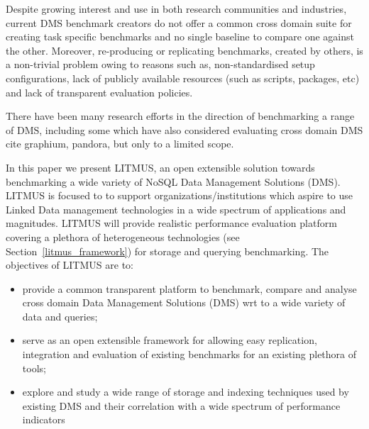 \documentclass{llncs}
\begin{document}
    Despite growing interest and use in both research communities and industries, current DMS benchmark creators do not offer a common cross domain suite for creating task specific benchmarks and no single baseline to compare one against the other. Moreover, re-producing or replicating benchmarks, created by others, is a non-trivial problem owing to reasons such as, non-standardised setup configurations, lack of publicly available resources (such as scripts, packages, etc) and lack of transparent evaluation policies. 
    
    There have been many research efforts in the direction of benchmarking a range of DMS, including some which have also considered evaluating cross domain DMS {cite graphium, pandora}, but only to a limited scope. 
    
    
    In this paper we present LITMUS, an open extensible solution towards benchmarking a wide variety of NoSQL Data Management Solutions (DMS). LITMUS is focused to to support organizations/institutions which aspire to use Linked Data management technologies in a wide spectrum of applications and magnitudes. 
    LITMUS will provide realistic performance evaluation platform covering a plethora of heterogeneous technologies (see Section~\ref{litmus_framework}) for storage and querying benchmarking. The objectives of LITMUS are to:
     \begin{itemize}[nosep]
        \item provide a common transparent platform to benchmark, compare and analyse cross domain Data Management Solutions (DMS) wrt to a wide variety of data and queries;       
        \item serve as an open extensible framework for allowing easy replication, integration and evaluation of existing benchmarks for an existing plethora of tools;
        \item explore and study a wide range of storage and indexing techniques used by existing DMS and their correlation with a wide spectrum of performance indicators
      \end{itemize}
    
\end{document}
